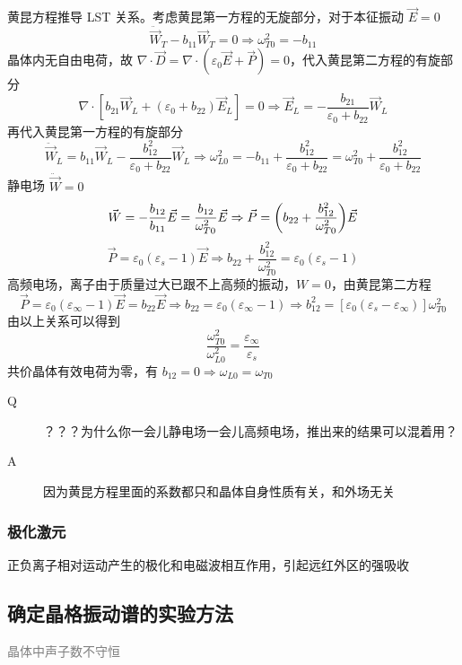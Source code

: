 {{黄昆方程推导 LST 关系。考虑黄昆第一方程的无旋部分，对于本征振动 $\vec{E} = 0$
\[ \ddot{\vec{W}}_T - b_{11} \vec{W}_T = 0 \Rightarrow \omega_{T 0}^2 = - b_{11} \]
晶体内无自由电荷，故 $\nabla \cdot \vec{D} = \nabla \cdot (\varepsilon_0 \vec{E} + \vec{P}) = 0$，代入黄昆第二方程的有旋部分
\[ \nabla \cdot [b_{21} \vec{W}_L + (\varepsilon_0 + b_{22}) \vec{E}_L] = 0 \Rightarrow \vec{E}_L = - \frac{b_{21}}{\varepsilon_0 + b_{22}} \vec{W}_L \]
再代入黄昆第一方程的有旋部分
\[ \ddot{\vec{W}}_L = b_{11} \vec{W}_L - \frac{b_{12}^2}{\varepsilon_0 + b_{22}} \vec{W}_L \Rightarrow \omega_{L 0}^2 = - b_{11} + \frac{b_{12}^2}{\varepsilon_0 + b_{22}} = \omega_{T 0}^2 +\frac{b_{12}^2}{\varepsilon_0 + b_{22}} \]
静电场 $\ddot{\vec{W}} = 0$
\[ \vec{W} = - \frac{b_{12}}{b_{11}} \vec{E} = \frac{b_{12}}{\omega_{T 0}^2} \vec{E} \Rightarrow \vec{P} = \qty(b_{22} + \frac{b_{12}^2}{\omega_{T 0}^2}) \vec{E} \]
\[ \vec{P} = \varepsilon_0 (\varepsilon_s - 1) \vec{E} \Rightarrow b_{22} + \frac{b_{12}^2}{\omega_{T 0}^2} = \varepsilon_0 (\varepsilon_s - 1) \]
高频电场，离子由于质量过大已跟不上高频的振动，$W = 0$，由黄昆第二方程
\[ \vec{P} = \varepsilon_0 (\varepsilon_{\infty} - 1) \vec{E} = b_{22} \vec{E} \Rightarrow b_{22} = \varepsilon_0 (\varepsilon_{\infty} - 1) \Rightarrow b_{12}^2 = [\varepsilon_0 (\varepsilon_s - \varepsilon_{\infty})] \omega_{T 0}^2 \]
由以上关系可以得到
\[ \frac{\omega_{T 0}^2}{\omega_{L 0}^2} = \frac{\varepsilon_{\infty}}{\varepsilon_s} \]
共价晶体有效电荷为零，有 $b_{12} = 0 \Rightarrow \omega_{L 0} = \omega_{T 0}$

\begin{description}
    \item[Q] ？？？为什么你一会儿静电场一会儿高频电场，推出来的结果可以混着用？
    \item[A] 因为黄昆方程里面的系数都只和晶体自身性质有关，和外场无关
\end{description}

\subsubsection{极化激元}

正负离子相对运动产生的极化和电磁波相互作用，引起远红外区的强吸收
}}

\subsection{确定晶格振动谱的实验方法}

\textcolor{gray}{晶体中声子数不守恒}

